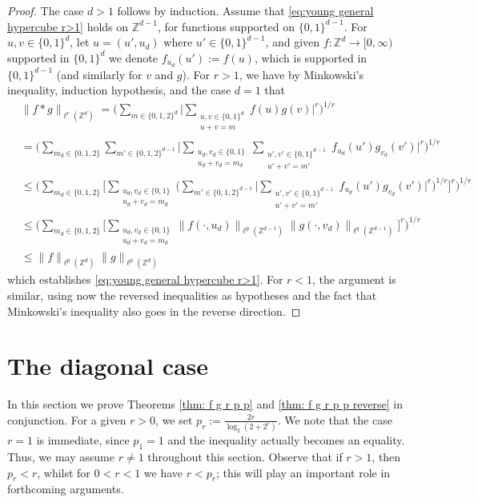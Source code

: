 \documentclass[reqno, 10pt]{amsart}
\theoremstyle{plain}
\numberwithin{equation}{section}
\theoremstyle{definition}
\newtheorem*{induction hypothesis}{Induction hypothesis}
\theoremstyle{remark}
\newcommand{\Z}{\mathbb{Z}}
\begin{document}
\begin{proof}
The case $d >1$ follows by induction. Assume that \eqref{eq:young general hypercube r>1} holds on $\Z^{d-1}$, for functions supported on $\{0,1\}^{d-1}$. For $u,v \in \{0,1\}^{d}$, let $u = (u', u_d)$ where $u' \in \{0,1\}^{d-1}$, and given $f:\Z^d \to [0,\infty)$ supported in $\{0,1\}^d$ we denote $f_{u_d}(u'):=f(u)$, which is supported in $\{0,1\}^{d-1}$ (and similarly for $v$ and $g$). For $r>1$, we have by Minkowski's inequality, induction hypothesis, and the case $d=1$ that
\begin{align*}
&\|f \ast g \|_{\ell^{r}(\Z^d)}  = \Big( \sum_{m \in \{0,1,2\}^d} \Big| \sum_{\substack{u,v \in \{0,1\}^d \\u+v=m}} f(u)g(v) \Big|^r \Big)^{1/r} \\
&  = \Big( \sum_{m_d \in \{0,1,2\}} \sum_{m' \in \{0,1,2\}^{d-1}} \Big|\sum_{\substack{u_d,v_d \in \{0,1\} \\u_d+v_d=m_d}} \sum_{\substack{u',v' \in \{0,1\}^{d-1} \\u'+v'=m'}} f_{u_d}(u')g_{v_d}(v') \Big|^r \Big)^{1/r} \\
& \leq \Big( \sum_{m_d \in \{0,1,2\}} \Big[\sum_{\substack{u_d,v_d \in \{0,1\} \\u_d+v_d=m_d}}  \Big( \sum_{m' \in \{0,1,2\}^{d-1}} \Big|\sum_{\substack{u',v' \in \{0,1\}^{d-1} \\u'+v'=m'}} f_{u_d}(u')g_{v_d}(v') \Big|^r\Big)^{1/r} \Big]^{r}  \Big)^{1/r} \\
& \leq \Big( \sum_{m_d \in \{0,1,2\}} \Big[\sum_{\substack{u_d,v_d \in \{0,1\} \\u_d+v_d=m_d}}  \|f(\cdot, u_d)\|_{\ell^p(\Z^{d-1})} \|g(\cdot, v_d)\|_{\ell^q(\Z^{d-1})} \Big]^{r}  \Big)^{1/r} \\
& \leq \|f\|_{\ell^p(\Z^d)} \|g\|_{\ell^p(\Z^d)}
\end{align*}
which establishes \eqref{eq:young general hypercube r>1}.  For $r<1$, the argument is similar, using now the reversed inequalities as hypotheses and the fact that Minkowski's inequality also goes in the reverse direction.
\end{proof}

\section{The diagonal case}\label{sec:diagonal}

In this section we prove Theorems \ref{thm: f g r p p} and \ref{thm: f g r p p reverse} in conjunction. For a given $r >0$, we set $p_r:=\frac{2r}{\log_2(2+2^r)}$. We note that the case $r=1$ is immediate, since $p_1=1$ and the inequality actually becomes an equality. Thus, we may assume $r \neq 1$ throughout this section. Observe that if $r>1$, then $p_r < r$, whilst for $0<r<1$ we have $r < p_r$; this will play an important role in forthcoming arguments.
\end{document}
